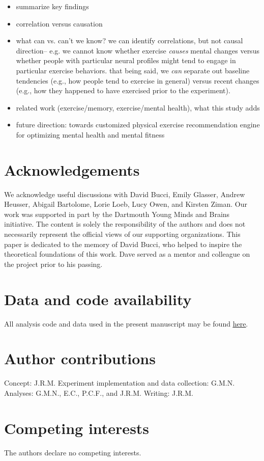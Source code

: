 \documentclass[10pt]{article}
\begin{document}
  \begin{itemize}
  \item summarize key findings
  \item correlation versus causation
         \item what can vs. can't we know?  we can identify correlations, but not causal direction-- e.g. we cannot know whether exercise \textit{causes} mental changes versus whether people with particular neural profiles might tend to engage in particular exercise behaviors.  that being said, we \textit{can} separate out baseline tendencies (e.g., how people tend to exercise in general) versus recent changes (e.g., how they happened to have exercised prior to the experiment).
  \item related work (exercise/memory, exercise/mental health), what this study adds
    \item future direction: towards customized physical exercise recommendation engine for optimizing mental health and mental fitness
    \end{itemize}

   


\section*{Acknowledgements}
We acknowledge useful discussions with David Bucci, Emily Glasser,
Andrew Heusser, Abigail Bartolome, Lorie Loeb, Lucy Owen, and Kirsten
Ziman.  Our work was supported in part by the Dartmouth Young Minds
and Brains initiative.  The content is solely the responsibility of
the authors and does not necessarily represent the official views of
our supporting organizations.  This paper is dedicated to the memory
of David Bucci, who helped to inspire the theoretical foundations of
this work.  Dave served as a mentor and colleague on the project prior
to his passing.


\section*{Data and code availability}
All analysis code and data used in the present manuscript may be found
\href{https://github.com/ContextLab/brainfit-paper}{\underline{here}}.

\section*{Author contributions}
Concept: J.R.M.  Experiment implementation and data collection: G.M.N.
Analyses: G.M.N., E.C., P.C.F., and J.R.M.  Writing: J.R.M.

\section*{Competing interests}
The authors declare no competing interests.



\end{document}
